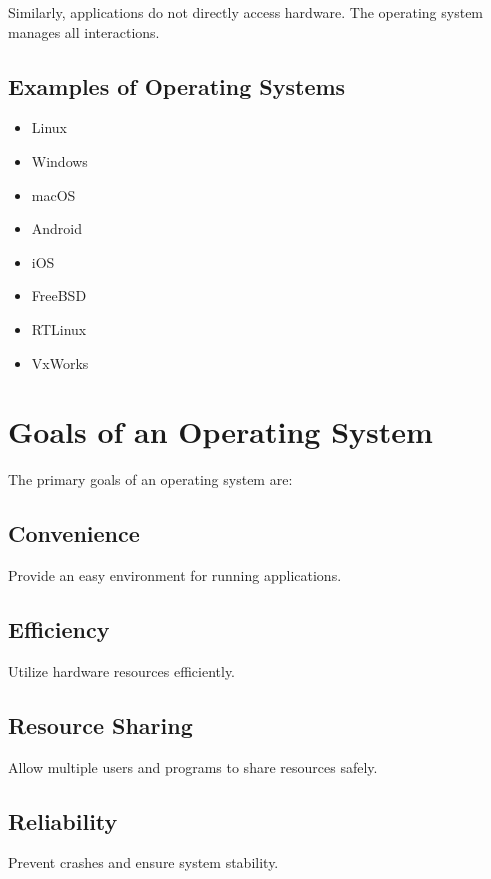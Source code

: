 Similarly, applications do not directly access hardware. The operating system manages all interactions.

\subsection{Examples of Operating Systems}

\begin{itemize}
\item Linux
\item Windows
\item macOS
\item Android
\item iOS
\item FreeBSD
\item RTLinux
\item VxWorks
\end{itemize}

\section{Goals of an Operating System}

The primary goals of an operating system are:

\subsection{Convenience}

Provide an easy environment for running applications.

\subsection{Efficiency}

Utilize hardware resources efficiently.

\subsection{Resource Sharing}

Allow multiple users and programs to share resources safely.

\subsection{Reliability}

Prevent crashes and ensure system stability.

